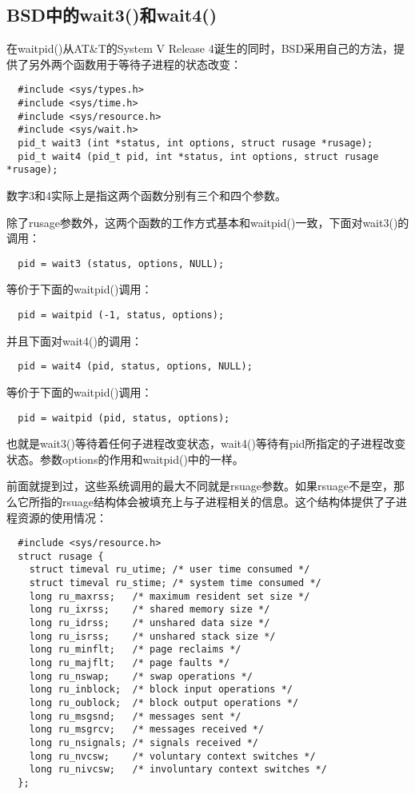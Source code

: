 \subsection{BSD中的wait3()和wait4()}
在waitpid()从AT\&T的System V Release 4诞生的同时，BSD采用自己的方法，提供了另外两个函数用于等待子进程的状态改变：

\begin{lstlisting}
  #include <sys/types.h>
  #include <sys/time.h>
  #include <sys/resource.h>
  #include <sys/wait.h>
  pid_t wait3 (int *status, int options, struct rusage *rusage);
  pid_t wait4 (pid_t pid, int *status, int options, struct rusage *rusage);
\end{lstlisting}

数字3和4实际上是指这两个函数分别有三个和四个参数。

除了rusage参数外，这两个函数的工作方式基本和waitpid()一致，下面对wait3()的调用：

\begin{lstlisting}
  pid = wait3 (status, options, NULL);
\end{lstlisting}

等价于下面的waitpid()调用：

\begin{lstlisting}
  pid = waitpid (-1, status, options);
\end{lstlisting}

并且下面对wait4()的调用：

\begin{lstlisting}
  pid = wait4 (pid, status, options, NULL);
\end{lstlisting}

等价于下面的waitpid()调用：

\begin{lstlisting}
  pid = waitpid (pid, status, options);
\end{lstlisting}

也就是wait3()等待着任何子进程改变状态，wait4()等待有pid所指定的子进程改变状态。参数options的作用和waitpid()中的一样。

前面就提到过，这些系统调用的最大不同就是rsuage参数。如果rsuage不是空，那么它所指的rsuage结构体会被填充上与子进程相关的信息。这个结构体提供了子进程资源的使用情况：

\begin{lstlisting}
  #include <sys/resource.h>
  struct rusage {
    struct timeval ru_utime; /* user time consumed */
    struct timeval ru_stime; /* system time consumed */
    long ru_maxrss;   /* maximum resident set size */
    long ru_ixrss;    /* shared memory size */
    long ru_idrss;    /* unshared data size */
    long ru_isrss;    /* unshared stack size */
    long ru_minflt;   /* page reclaims */
    long ru_majflt;   /* page faults */
    long ru_nswap;    /* swap operations */
    long ru_inblock;  /* block input operations */
    long ru_oublock;  /* block output operations */
    long ru_msgsnd;   /* messages sent */
    long ru_msgrcv;   /* messages received */
    long ru_nsignals; /* signals received */
    long ru_nvcsw;    /* voluntary context switches */
    long ru_nivcsw;   /* involuntary context switches */
  };
\end{lstlisting}

